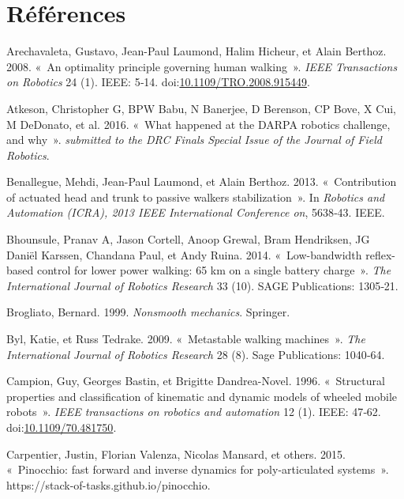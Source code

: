 \documentclass[french,A4paper,]{book}
\begin{document}
\part*{Références}\label{ruxe9fuxe9rences}


\hypertarget{refs}{}
\hypertarget{ref-arechavaleta08}{}
Arechavaleta, Gustavo, Jean-Paul Laumond, Halim Hicheur, et Alain
Berthoz. 2008. «~An optimality principle governing human walking~».
\emph{IEEE Transactions on Robotics} 24 (1). IEEE: 5‑14.
doi:\href{https://doi.org/10.1109/TRO.2008.915449}{10.1109/TRO.2008.915449}.

\hypertarget{ref-atkeson16}{}
Atkeson, Christopher G, BPW Babu, N Banerjee, D Berenson, CP Bove, X
Cui, M DeDonato, et al. 2016. «~What happened at the DARPA robotics
challenge, and why~». \emph{submitted to the DRC Finals Special Issue of
the Journal of Field Robotics}.

\hypertarget{ref-benallegue13}{}
Benallegue, Mehdi, Jean-Paul Laumond, et Alain Berthoz. 2013.
«~Contribution of actuated head and trunk to passive walkers
stabilization~». In \emph{Robotics and Automation (ICRA), 2013 IEEE
International Conference on}, 5638‑43. IEEE.

\hypertarget{ref-bhounsule14}{}
Bhounsule, Pranav A, Jason Cortell, Anoop Grewal, Bram Hendriksen, JG
Daniël Karssen, Chandana Paul, et Andy Ruina. 2014. «~Low-bandwidth
reflex-based control for lower power walking: 65 km on a single battery
charge~». \emph{The International Journal of Robotics Research} 33 (10).
SAGE Publications: 1305‑21.

\hypertarget{ref-brogliato99}{}
Brogliato, Bernard. 1999. \emph{Nonsmooth mechanics}. Springer.

\hypertarget{ref-byl09}{}
Byl, Katie, et Russ Tedrake. 2009. «~Metastable walking machines~».
\emph{The International Journal of Robotics Research} 28 (8). Sage
Publications: 1040‑64.

\hypertarget{ref-campion96}{}
Campion, Guy, Georges Bastin, et Brigitte Dandrea-Novel. 1996.
«~Structural properties and classification of kinematic and dynamic
models of wheeled mobile robots~». \emph{IEEE transactions on robotics
and automation} 12 (1). IEEE: 47‑62.
doi:\href{https://doi.org/10.1109/70.481750}{10.1109/70.481750}.

\hypertarget{ref-pinocchioweb}{}
Carpentier, Justin, Florian Valenza, Nicolas Mansard, et others. 2015.
«~Pinocchio: fast forward and inverse dynamics for poly-articulated
systems~». https://stack-of-tasks.github.io/pinocchio.
\end{document}
